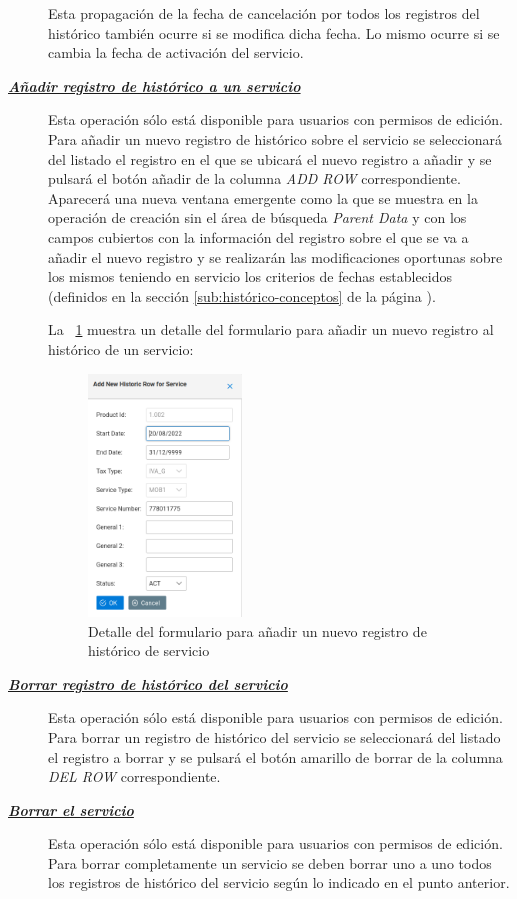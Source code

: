\begin{description}
Esta propagación de la fecha de cancelación por todos los registros del histórico  también ocurre si se modifica dicha fecha. Lo mismo ocurre si se cambia la fecha de activación del servicio.

\item[\underline{\textsl{\textbf{Añadir registro de histórico a un servicio}}}] Esta operación sólo está disponible para usuarios con permisos de edición.
Para añadir un nuevo registro de histórico sobre el servicio se seleccionará del listado el registro en el que se ubicará el nuevo registro a añadir y se pulsará el botón añadir de la columna \textit{ADD ROW} correspondiente. Aparecerá una nueva ventana emergente como la que se muestra en la operación de creación sin el área de búsqueda \emph{Parent Data} y con los campos cubiertos con la información del registro sobre el que se va a añadir el nuevo registro y se realizarán las modificaciones oportunas sobre los mismos teniendo en servicio los criterios de fechas establecidos (definidos en la sección \ref{sub:histórico-conceptos} de la página \pageref{sub:histórico-conceptos}).

La \figurename~\ref{fig:nuevo-historico-servicio} muestra un detalle del formulario para añadir un nuevo registro al histórico de un servicio:

\begin{figure}[H]
  \centering
  \includegraphics[width=0.40\textwidth]{imaxes/nuevo-historico-servicio.png}
  \caption{Detalle del formulario para añadir un nuevo registro de histórico de servicio}
  \label{fig:nuevo-historico-servicio}
\end{figure}


\item[\underline{\textsl{\textbf{Borrar registro de histórico del servicio}}}] Esta operación sólo está disponible para usuarios con permisos de edición.
Para borrar un registro de histórico del servicio se seleccionará del listado el registro a borrar y se pulsará el botón amarillo de borrar de la columna \textit{DEL ROW} correspondiente.

\item[\underline{\textsl{\textbf{Borrar el servicio}}}] Esta operación sólo está disponible para usuarios con permisos de edición.
Para borrar completamente un servicio se deben borrar uno a uno todos los registros de histórico del servicio según lo indicado en el punto anterior. 
\end{description}


